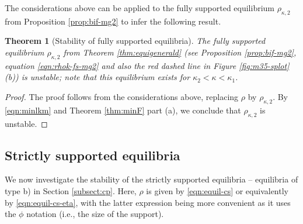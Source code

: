 \documentclass[11pt]{amsart}
\newtheorem{theorem}{Theorem}[section]
\begin{document}
The considerations above can be applied to the fully supported equilibrium $\rho_{\kappa,2}$ from Proposition \ref{prop:bif-mg2} to infer the following result.

\begin{theorem}[Stability of fully supported equilibria]
\label{thm:mg2:fs-stab}
The fully supported equilibrium $\rho_{\kappa,2}$ from Theorem \ref{thm:equigenerald} (see Proposition \ref{prop:bif-mg2}, equation \eqref{eqn:rhok-fs-mg2} and also the red dashed line in Figure \ref{fig:m35-splot}(b)) is unstable; note that this equilibrium exists for $\kappa_2<\kappa<\kappa_1$. 
\end{theorem}
\begin{proof}
The proof follows from the considerations above, replacing $\rho$ by $\rho_{\kappa,2}$. By \eqref{eqn:minlkm} and Theorem \ref{thm:minF} part (a), we conclude that $\rho_{\kappa,2}$ is unstable.
\end{proof}


\subsection{Strictly supported equilibria}
\label{subsect:mg2:cs}

We now investigate the stability of the strictly supported equilibria -- equilibria of type b) in Section \ref{subsect:cp}. Here, $\rho$ is given by  \eqref{eqn:equil-cs} or equivalently by \eqref{eqn:equil-cs-eta}, with the latter expression being more convenient as it uses the $\phi$ notation (i.e., the size of the support). 
\end{document}
